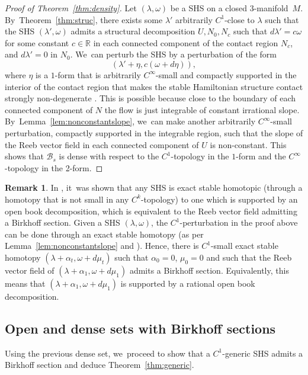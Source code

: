 \documentclass[11pt]{article}
\newcommand{\threemanifold}{$3$\nobreakdash-mani\-fold\xspace}
\theoremstyle{definition}
\newtheorem{Remark}[theorem]{Remark}
\begin{document}
\begin{proof}[Proof of Theorem~\ref{thm:density}]
Let $(\lambda,\omega)$ be a SHS on a closed \threemanifold~$M$. By~Theorem~\ref{thm:struc}, there exists some $\lambda'$ arbitrarily $C^1$-close to $\lambda$ such that the SHS $(\lambda',\omega)$ admits a structural decomposition $U, N_0, N_c$ such that $d\lambda'=c\omega$ for some constant $c\in \mathbb{R}$ in each connected component of the contact region $N_c$, and $d\lambda'=0$ in $N_0$. We~can perturb the SHS by a perturbation of the form
\[
(\lambda'+ \eta, c(\omega+d\eta)),
\]
where $\eta$ is a $1$-form that is arbitrarily $C^\infty$-small and compactly supported in the interior of the contact region that makes the stable Hamiltonian structure contact strongly non-degenerate \cite{CM, Ro, Pe}. This is possible because close to the boundary of each connected component of $N$ the flow is just integrable of constant irrational slope. By~Lemma~\ref{lem:nonconstantslope}, we~can make another arbitrarily $C^\infty$-small perturbation, compactly supported in the integrable region, such that the slope of the Reeb vector field in each connected component of $U$ is non-constant. This shows that $\mathcal{B}_s$ is dense with respect to the $C^1$-topology in the $1$-form and the $C^\infty$-topology in the 2-form.
\end{proof}

\begin{Remark}\label{rm:rat}
In \cite{CV0}, it~was shown that any SHS is exact stable homotopic (through a homotopy that is not small in any $C^k$-topology) to one which is supported by an open book decomposition, which is equivalent to the Reeb vector field admitting a Birkhoff section. Given a SHS $(\lambda, \omega)$, the $C^1$-perturbation in the proof above can be done through an exact stable homotopy (as per Lemma~\ref{lem:nonconstantslope} and \cite[Th.\,4.6]{CV1}). Hence, there is $C^1$-small exact stable homotopy $(\lambda+\alpha_t, \omega+ d\mu_t)$ such that $\alpha_0=0$, $\mu_0=0$ and such that the Reeb vector field of $(\lambda+\alpha_1, \omega+d\mu_1)$ admits a Birkhoff section. Equivalently, this means that $(\lambda+\alpha_1,\omega+d\mu_1)$ is supported by a rational open book decomposition.
\end{Remark}

\subsection{Open and dense sets with Birkhoff sections}
Using the previous dense set, we~proceed to show that a $C^1$-generic SHS admits a Birkhoff section and deduce Theorem~\ref{thm:generic}.
\end{document}
